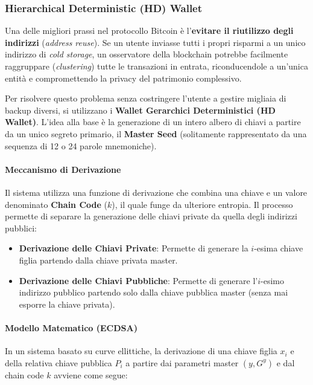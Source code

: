 \subsubsection*{Hierarchical Deterministic (HD) Wallet}

Una delle migliori prassi nel protocollo Bitcoin è l'\textbf{evitare il riutilizzo degli indirizzi} (\textit{address reuse}). Se un utente inviasse tutti i propri risparmi a un unico indirizzo di \textit{cold storage}, un osservatore della blockchain potrebbe facilmente raggruppare (\textit{clustering}) tutte le transazioni in entrata, riconducendole a un'unica entità e compromettendo la privacy del patrimonio complessivo.

Per risolvere questo problema senza costringere l'utente a gestire migliaia di backup diversi, si utilizzano i \textbf{Wallet Gerarchici Deterministici (HD Wallet)}. L'idea alla base è la generazione di un intero albero di chiavi a partire da un unico segreto primario, il \textbf{Master Seed} (solitamente rappresentato da una sequenza di 12 o 24 parole mnemoniche).

\paragraph{Meccanismo di Derivazione}
Il sistema utilizza una funzione di derivazione che combina una chiave e un valore denominato \textbf{Chain Code} ($k$), il quale funge da ulteriore entropia. Il processo permette di separare la generazione delle chiavi private da quella degli indirizzi pubblici:

\begin{itemize}
    \item \textbf{Derivazione delle Chiavi Private}: Permette di generare la $i$-esima chiave figlia partendo dalla chiave privata master.
    \item \textbf{Derivazione delle Chiavi Pubbliche}: Permette di generare l'$i$-esimo indirizzo pubblico partendo solo dalla chiave pubblica master (senza mai esporre la chiave privata).
\end{itemize}

\paragraph{Modello Matematico (ECDSA)}
In un sistema basato su curve ellittiche, la derivazione di una chiave figlia $x_i$ e della relativa chiave pubblica $P_i$ a partire dai parametri master $(y, G^y)$ e dal chain code $k$ avviene come segue:

